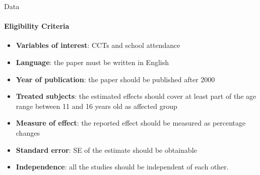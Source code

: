 \documentclass{beamer}
\begin{document}

\begin{frame}{Data}
\framesubtitle{Eligibility Criteria}

\begin{itemize}
    \item \textbf{Variables of interest}: CCTs and school attendance
    \item \textbf{Language}: the paper must be written in English
    \item \textbf{Year of publication}: the paper should be published after 2000
    \item \textbf{Treated subjects}: the estimated effects should cover at least part of the age range between 11 and 16 years old as affected group
    \item \textbf{Measure of effect}: the reported effect should be measured as percentage changes
    \item \textbf{Standard error}: SE of the estimate should be obtainable
    \item \textbf{Independence}: all the studies should be independent of each other.
\end{itemize}

\end{frame}


\end{document}

